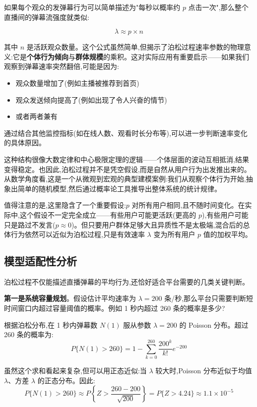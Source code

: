 \documentclass[12pt,a4paper]{article}
\begin{document}
如果每个观众的发弹幕行为可以简单描述为"每秒以概率约 $p$ 点击一次",那么整个直播间的弹幕流强度就类似:

\begin{equation}
\lambda \approx p \times n
\end{equation}

其中 $n$ 是活跃观众数量。这个公式虽然简单,但揭示了泊松过程速率参数的物理意义:它是\textbf{个体行为倾向}与\textbf{群体规模}的乘积。这对实际应用有重要启示——如果我们观察到弹幕速率突然翻倍,可能是因为:
\begin{itemize}
\item 观众数量增加了(例如主播被推荐到首页)
\item 观众发送倾向提高了(例如出现了令人兴奋的情节)
\item 或者两者兼有
\end{itemize}

通过结合其他监控指标(如在线人数、观看时长分布等),可以进一步判断速率变化的具体原因。

这种结构很像大数定律和中心极限定理的逻辑——个体层面的波动互相抵消,结果变得稳定。也因此,泊松过程并不是凭空假设,而是自然从用户行为出发推出来的。从数学角度看,这是一个从微观到宏观的典型建模案例:我们从观察个体行为开始,抽象出简单的随机模型,然后通过概率论工具推导出整体系统的统计规律。

值得注意的是,这里隐含了一个重要假设:$p$ 对所有用户相同,且不随时间变化。在实际中,这个假设不一定完全成立——有些用户可能更活跃(更高的 $p$),有些用户可能只是路过不发言($p \approx 0$)。但只要用户群体足够大且异质性不是太极端,混合后的总体行为依然可以近似为泊松过程,只是有效速率 $\lambda$ 变为所有用户 $p$ 值的加权平均。

\subsection{模型适配性分析}

泊松过程不仅能描述直播弹幕的平均行为,还恰好适合平台需要的几类关键判断。

\textbf{第一是系统容量规划}。假设估计平均速率为 $\lambda = 200$ 条/秒,那么平台只需要判断短时间窗口内超过容量阈值的概率。例如 1 秒内超过 260 条的概率是多少?

根据泊松分布,在 1 秒内弹幕数 $N(1)$ 服从参数 $\lambda = 200$ 的 Poisson 分布。超过 260 条的概率为:
\begin{equation}
P\{N(1) > 260\} = 1 - \sum_{k=0}^{260} \frac{200^k}{k!}e^{-200}
\end{equation}

虽然这个求和看起来复杂,但可以用正态近似:当 $\lambda$ 较大时,Poisson 分布近似于均值 $\lambda$、方差 $\lambda$ 的正态分布。因此:
\begin{equation}
P\{N(1) > 260\} \approx P\left\{Z > \frac{260-200}{\sqrt{200}}\right\} = P\{Z > 4.24\} \approx 1.1 \times 10^{-5}
\end{equation}
\end{document}
